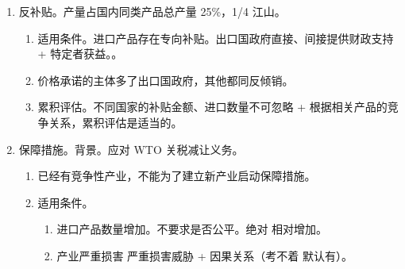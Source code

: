 \begin{enumerate}
\begin{enumerate}
\begin{enumerate}
                        \begin{kk}{价格承诺（只适用于两反）}
                          \begin{enumerate}
                            \item 商务部只提建议，出口经营者可以作出承诺。
                            \item 商务部可以接受，拒绝要说明理由。
                            \item 初裁前商务部不能主动寻求 \hz 接受价格承诺（要先计算倾销幅度）。
                          \end{enumerate}
                        \end{kk}
                \end{enumerate}
          \item 累积评估。同时满足才可以！！
                \begin{enumerate}
                  \item 来自每一个国家进口产品的倾销幅度 \%，并且其进口量不可忽略不计。
                  \item 根据进口产品之间以及进口产品与国内同类产品之间的竞争条件，进行累积评估是适当的。
                \end{enumerate}
        \end{enumerate}
  \item 反补贴。产量占国内同类产品总产量 25\%，1/4 江山。
        \begin{enumerate}
          \item 适用条件。进口产品存在专向补贴。出口国政府直接、间接提供财政支持 + 特定者获益。。
          \item 价格承诺的主体多了出口国政府，其他都同反倾销。
          \item 累积评估。不同国家的补贴金额、进口数量不可忽略 + 根据相关产品的竞争关系，累积评估是适当的。
        \end{enumerate}
  \item 保障措施。背景。应对 WTO 关税减让义务。
        \begin{enumerate}
          \item 已经有竞争性产业，不能为了建立新产业启动保障措施。
          \item 适用条件。
                \begin{enumerate}
                  \item 进口产品数量增加。\yi 不要求是否公平。\er 绝对 \hz 相对增加。
                  \item 产业严重损害 \hz 严重损害威胁 + 因果关系（考不着 \yjt 默认有）。

\end{enumerate}
\end{enumerate}
\end{enumerate}
